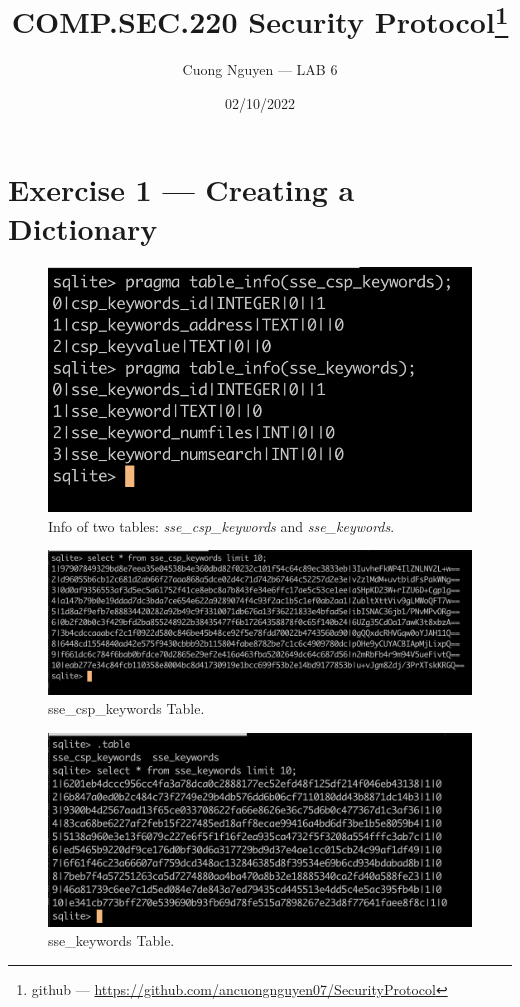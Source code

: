 \documentclass{article}
\title{COMP.SEC.220 Security Protocol\footnote{github --- \url{https://github.com/ancuongnguyen07/SecurityProtocol}}}
\author{Cuong Nguyen --- LAB 6}
\date{02/10/2022}
\begin{document}
    
\maketitle

\section*{Exercise 1 --- Creating a Dictionary}

\begin{figure}
    \centering
    \includegraphics[height=\textheight,width=\textwidth,
                    keepaspectratio]{tables_info.png}
    \caption{Info of two tables: \emph{sse\_csp\_keywords} and
    \emph{sse\_keywords}.}
\end{figure}

\begin{figure}
    \centering
    \includegraphics[height=\textheight,width=\textwidth,
    keepaspectratio]{sse_csp_keywords_table.png}
    \caption{sse\_csp\_keywords Table.}\label{fig:sse_csp_keywords}
\end{figure}

\begin{figure}
    \centering
    \includegraphics[height=\textheight,width=\textwidth,
    keepaspectratio]{sse_keywords_table.png}
    \caption{sse\_keywords Table.}\label{fig:sse_keywords}
\end{figure}
\end{document}
